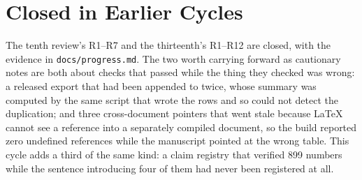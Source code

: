 \documentclass[11pt]{article}
\begin{document}
\section*{Closed in Earlier Cycles}

The tenth review's R1--R7 and the thirteenth's R1--R12 are closed, with the
evidence in \texttt{docs/progress.md}. The two worth carrying forward as
cautionary notes are both about checks that passed while the thing they
checked was wrong: a released export that had been appended to twice, whose
summary was computed by the same script that wrote the rows and so could not
detect the duplication; and three cross-document pointers that went stale
because \LaTeX{} cannot see a reference into a separately compiled document,
so the build reported zero undefined references while the manuscript pointed
at the wrong table. This cycle adds a third of the same kind: a claim registry
that verified 899 numbers while the sentence introducing four of them had
never been registered at all.
\end{document}

